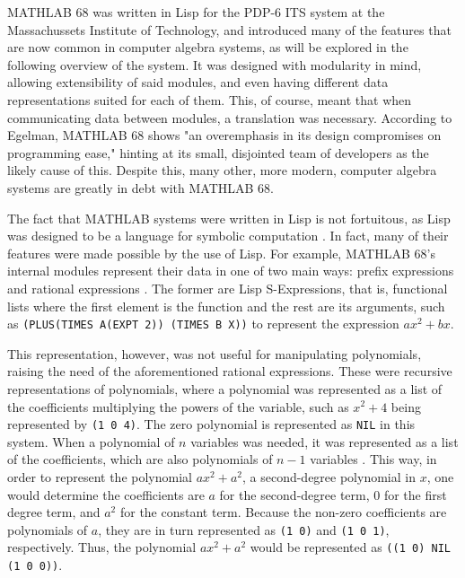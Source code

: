 MATHLAB 68 was written in Lisp for the PDP-6 ITS system at the Massachussets Institute of Technology, and introduced many of the features that are now common in computer algebra systems, as will be explored in the following overview of the system. It was designed with modularity in mind, allowing extensibility of said modules, and even having different data representations suited for each of them. This, of course, meant that when communicating data between modules, a translation was necessary. According to Egelman, MATHLAB 68 shows "an overemphasis in its design compromises on programming ease," \parencite{engelman1971legacy} hinting at its small, disjointed team of developers as the likely cause of this. Despite this, many other, more modern, computer algebra systems are greatly in debt with MATHLAB 68.

The fact that MATHLAB systems were written in Lisp is not fortuitous, as Lisp was designed to be a language for symbolic computation \parencite{touretzky2013common}. In fact, many of their features were made possible by the use of Lisp. For example, MATHLAB 68's internal modules represent their data in one of two main ways: prefix expressions and rational expressions \parencite{engelman1971legacy}. The former are Lisp S-Expressions, that is, functional lists where the first element is the function and the rest are its arguments, such as \verb|(PLUS(TIMES A(EXPT 2)) (TIMES B X))| to represent the expression $ax^2 + bx$.

This representation, however, was not useful for manipulating polynomials, raising the need of the aforementioned rational expressions. These were recursive representations of polynomials, where a polynomial was represented as a list of the coefficients multiplying the powers of the variable, such as $x^2 + 4$ being represented by \verb|(1 0 4)|. The zero polynomial is represented as \verb|NIL| in this system. When a polynomial of $n$ variables was needed, it was represented as a list of the coefficients, which are also polynomials of $n - 1$ variables \parencite{engelman1971legacy}. This way, in order to represent the polynomial $ax^2 + a^2$, a second-degree polynomial in $x$, one would determine the coefficients are $a$ for the second-degree term, $0$ for the first degree term, and $a^2$ for the constant term. Because the non-zero coefficients are polynomials of $a$, they are in turn represented as \verb|(1 0)| and \verb|(1 0 1)|, respectively. Thus, the polynomial $ax^2 + a^2$ would be represented as \verb|((1 0) NIL (1 0 0))|.

